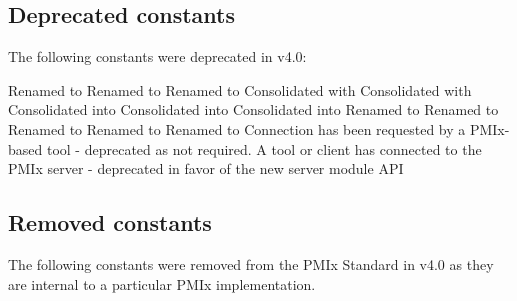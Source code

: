 \subsection{Deprecated constants}

The following constants were deprecated in v4.0:

\begin{constantdesc}
%
Renamed to 
%
Renamed to 
%
Renamed to 
%
Consolidated with 
%
Consolidated with 
%
Consolidated into 
%
Consolidated into 
%
Consolidated into 
%
Renamed to 
%
Renamed to 
%
Renamed to 
%
Renamed to 
%
Renamed to 
%
Connection has been requested by a PMIx-based tool - deprecated as
not required.
%
A tool or client has connected to the \ac{PMIx} server - deprecated in
favor of the new  server
module \ac{API}
%
\end{constantdesc}

\subsection{Removed constants}

The following constants were removed from the \ac{PMIx} Standard in v4.0
as they are internal to a particular \ac{PMIx} implementation.

